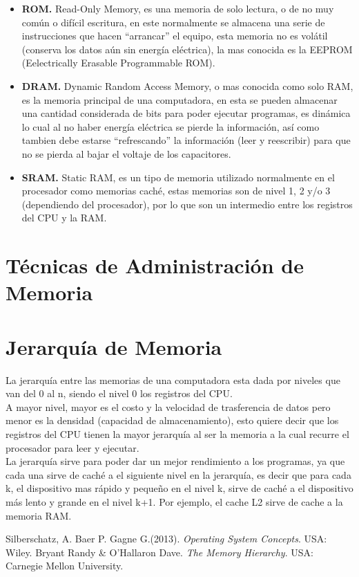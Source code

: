 \documentclass[spanish,12pt,letterpapper]{article}
\begin{document}
	\begin{itemize}
	\item \textbf{ROM.} Read-Only Memory, es una memoria de solo lectura, o de no muy común o difícil escritura, en este normalmente se almacena una serie de instrucciones que hacen ``arrancar'' el equipo, esta memoria no es volátil (conserva los datos aún sin energía eléctrica), la mas conocida es la EEPROM (Eelectrically Erasable Programmable ROM).
	
	\item \textbf{DRAM.} Dynamic Random Access Memory, o mas conocida como solo RAM, es la memoria principal de una computadora, en esta se pueden almacenar una cantidad considerada de bits para poder ejecutar programas, es dinámica lo cual al no haber energía eléctrica se pierde la información, así como tambien debe estarse ``refrescando'' la información (leer y reescribir) para que no se pierda al bajar el voltaje de los capacitores.
	
	\item \textbf{SRAM.} Static RAM, es un tipo de memoria utilizado normalmente en el procesador como memorias caché, estas memorias son de nivel 1, 2 y/o 3 (dependiendo del procesador), por lo que son un intermedio entre los registros del CPU y la RAM.
    \end{itemize}	 
	
	\section{Técnicas de Administración de Memoria}
		
	
	
	\section{Jerarquía de Memoria}
	La jerarquía entre las memorias de una computadora esta dada por niveles que van del 0 al n, siendo el nivel 0 los registros del CPU.\\
	
	A mayor nivel, mayor es el costo y la velocidad de trasferencia de datos pero menor es la densidad (capacidad de almacenamiento), esto quiere decir que los registros del CPU tienen la mayor jerarquía al ser la memoria a la cual recurre el procesador para leer y ejecutar.\\
	
	La jerarquía sirve para poder dar un mejor rendimiento a los programas, ya que cada una sirve de caché a el siguiente nivel en la jerarquía, es decir que para cada k, el dispositivo mas rápido y pequeño en el nivel k, sirve de caché a el dispositivo más lento y grande en el nivel k+1. Por ejemplo, el cache L2 sirve de cache a la memoria RAM.\\
	
	\pagebreak
	\begin{thebibliography}{9}
		 Silberschatz, A. Baer P. Gagne G.(2013).
		\emph{Operating System Concepts}. USA: Wiley.
		 Bryant Randy \& O’Hallaron Dave.
		\emph{The Memory Hierarchy}. USA: Carnegie Mellon University.
	\end{thebibliography}
	
	
	
	
\end{document}
